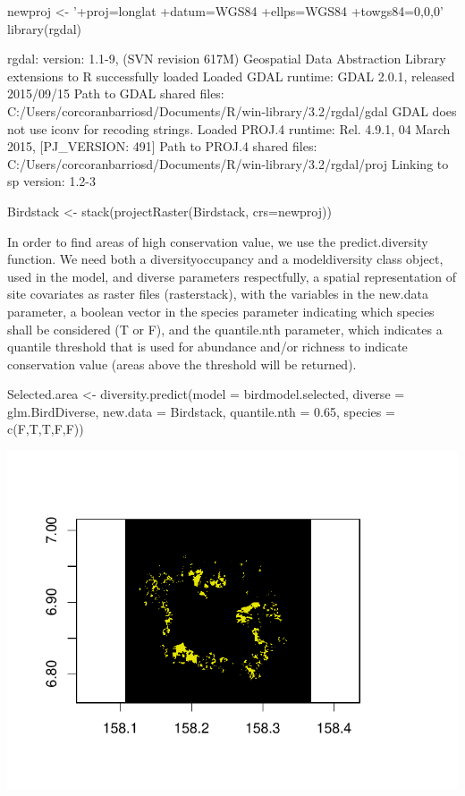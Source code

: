 \documentclass[article]{jss}
\begin{document}
\begin{CodeChunk}
\begin{CodeInput}
newproj <- '+proj=longlat +datum=WGS84 +ellps=WGS84 +towgs84=0,0,0'
library(rgdal)
\end{CodeInput}
\begin{CodeOutput}
rgdal: version: 1.1-9, (SVN revision 617M)
 Geospatial Data Abstraction Library extensions to R successfully loaded
 Loaded GDAL runtime: GDAL 2.0.1, released 2015/09/15
 Path to GDAL shared files: C:/Users/corcoranbarriosd/Documents/R/win-library/3.2/rgdal/gdal
 GDAL does not use iconv for recoding strings.
 Loaded PROJ.4 runtime: Rel. 4.9.1, 04 March 2015, [PJ_VERSION: 491]
 Path to PROJ.4 shared files: C:/Users/corcoranbarriosd/Documents/R/win-library/3.2/rgdal/proj
 Linking to sp version: 1.2-3 
\end{CodeOutput}
\begin{CodeInput}
Birdstack <- stack(projectRaster(Birdstack, crs=newproj))
\end{CodeInput}
\end{CodeChunk}

In order to find areas of high conservation value, we use the
predict.diversity function. We need both a diversityoccupancy and a
modeldiversity class object, used in the model, and diverse parameters
respectfully, a spatial representation of site covariates as raster
files (rasterstack), with the variables in the new.data parameter, a
boolean vector in the species parameter indicating which species shall
be considered (T or F), and the quantile.nth parameter, which indicates
a quantile threshold that is used for abundance and/or richness to
indicate conservation value (areas above the threshold will be
returned).

\begin{CodeChunk}
\begin{CodeInput}
Selected.area <- diversity.predict(model = birdmodel.selected, diverse = glm.BirdDiverse, new.data = Birdstack, quantile.nth = 0.65, species =
c(F,T,T,F,F))
\end{CodeInput}


\begin{center}\includegraphics{diversityocc_files/figure-latex/unnamed-chunk-22-1} \end{center}

\end{CodeChunk}
\end{document}
